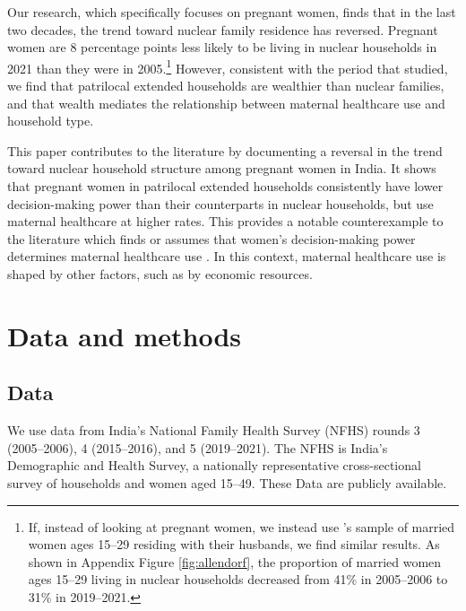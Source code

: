 \documentclass[10pt,twoside,reqno]{article}
\begin{document}
Our research, which specifically focuses on pregnant women, finds that in the last two decades, the trend toward nuclear family residence has reversed. Pregnant women are 8 percentage points less likely to be living in nuclear households in 2021 than they were in 2005.\footnote{If, instead of looking at pregnant women, we instead use \cite{allendorf2013going}'s sample of married women ages 15--29 residing with their husbands, we find similar results.  As shown in Appendix Figure \ref{fig:allendorf}, the proportion of married women ages 15--29 living in nuclear households decreased from 41\% in 2005--2006 to 31\% in 2019--2021.}  However, consistent with the period that \cite{allendorf2013going} studied, we find that patrilocal extended households are wealthier than nuclear families, and that wealth mediates the relationship between maternal healthcare use and household type. 

This paper contributes to the literature by documenting a reversal in the trend toward nuclear household structure among pregnant women in India. It shows that pregnant women in patrilocal extended households consistently have lower decision-making power than their counterparts in nuclear households, but use maternal healthcare at higher rates. This provides a notable counterexample to the literature which finds or assumes that women's decision-making power determines maternal healthcare use \citep{majumder2024does,mistry2009women}.  In this context, maternal healthcare use is shaped by other factors, such as by economic resources.

\section{Data and methods}\label{sec:data_and_methods} %

\subsection{Data} \label{sec:data}

We use data from India’s National Family Health Survey (NFHS) rounds 3 (2005–2006), 4 (2015–2016), and 5 (2019–2021). The NFHS is India’s Demographic and Health Survey, a nationally representative cross-sectional survey of households and women aged 15–49. These Data are publicly available.
\end{document}
